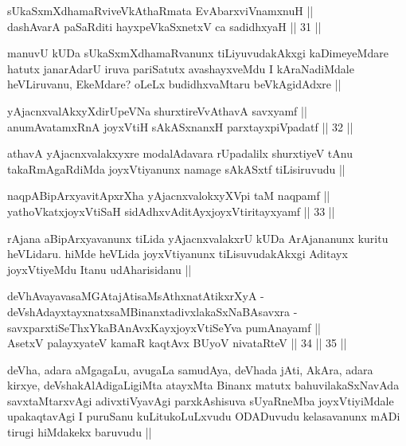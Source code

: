
\begin{shl}
sUkaSxmXdhamaRviveVkAthaRmata EvAbarxviVnamxnuH || \\
dashAvarA paSaRditi hayxpeVkaSxnetxV ca sadidhxyaH ||  31 ||  
\end{shl}

\begin{artha}
manuvU kUDa sUkaSxmXdhamaRvanunx tiLiyuvudakAkxgi kaDimeyeMdare hatutx janarAdarU iruva pariSatutx avashayxveMdu I kAraNadiMdale heVLiruvanu, EkeMdare? oLeLx budidhxvaMtaru beVkAgidAdxre ||
\end{artha}

\begin{shl}
yAjacnxvalAkxyXdirUpeVNa shurxtireVvAthavA savxyamf || \\
anumAvatamxRnA joyxVtiH sAkASxnanxH parxtayxpiVpadatf ||  32 ||  
\end{shl}

\begin{artha}
athavA yAjacnxvalakxyxre modalAdavara rUpadalilx shurxtiyeV tAnu takaRmAgaRdiMda joyxVtiyanunx namage sAkASxtf tiLisiruvudu ||
\end{artha}

\begin{shl}
naqpABipArxyavitApxrXha yAjacnxvalokxyXV\s pi taM naqpamf || \\
yathoVkatxjoyxVtiSaH sidAdhxvAditAyxjoyxVtiritayxyamf ||  33 ||  
\end{shl}

\begin{artha}
rAjana aBipArxyavanunx tiLida yAjacnxvalakxrU kUDa ArAjananunx kuritu heVLidaru. hiMde heVLida joyxVtiyanunx tiLisuvudakAkxgi Aditayx joyxVtiyeMdu Itanu udAharisidanu ||
\end{artha}

\begin{shl}
deVhAvayavasaMGAtajAtisaMsAthxnatAtikxrXyA -\\
deVshAdayxtayxnatxsaMBinanxtadivxlakaSxNaBAsavxra - \\
savxparxtiSeThxYkaBAnAvxKayxjoyxVtiSeYva pumAnayamf || \\
AsetxV palayxyateV kamaR kaqtAvx BUyoV nivataRteV ||  34 ||  35 ||  
\end{shl}

\begin{artha}
deVha, adara aMgagaLu, avugaLa samudAya, deVhada jAti, AkAra, adara kirxye, deVshakAlAdigaLigiMta atayxMta Binanx matutx bahuvilakaSxNavAda savxtaMtarxvAgi adivxtiVyavAgi parxkAshisuva sUyaRneMba joyxVtiyiMdale upakaqtavAgi I puruSanu kuLitukoLuLxvudu ODADuvudu kelasavanunx mADi tirugi hiMdakekx baruvudu ||
\end{artha}

